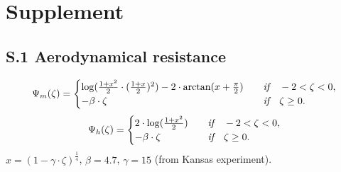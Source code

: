 \documentclass[manuscript]{copernicus}
\begin{document}
\clearpage
\setcounter{page}{1}
\section*{Supplement}
\subsection*{S.1 Aerodynamical resistance}
\begin{equation}
  \Psi_m(\zeta) =
  \begin{cases}
   \log(\frac{1+x^2}{2}\cdot(\frac{1+x}{2})^2) - 2\cdot \arctan(x+\frac{\pi}{2}) & \quad \emph{if} \quad -2 < \zeta < 0,\\
   - \beta \cdot \zeta & \quad \emph{if} \quad \zeta \ge 0.
  \end{cases}
  \label{eq:psim}
\end{equation}
\begin{equation}
  \Psi_h(\zeta) =
  \begin{cases}
   2\cdot\log(\frac{1+x^2}{2}) & \quad \emph{if} \quad -2 < \zeta < 0,\\
   - \beta \cdot \zeta & \quad \emph{if} \quad \zeta \ge 0.
  \end{cases}
  \label{eq:psih}
\end{equation}
$x = (1-\gamma\cdot\zeta)^\frac{1}{4}$, $\beta = 4.7$, $\gamma = 15$ (from Kansas experiment).
\end{document}
